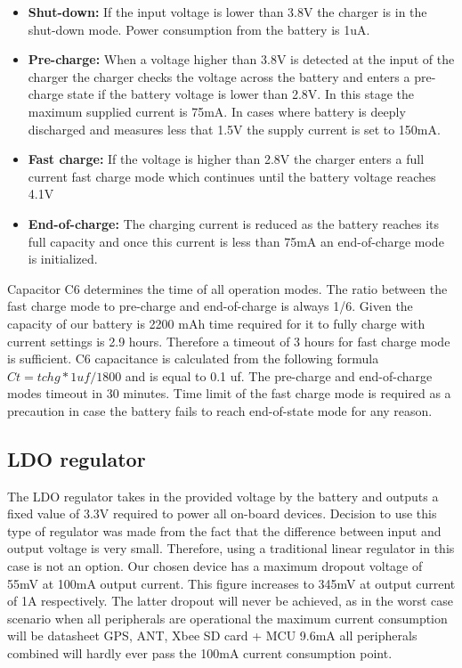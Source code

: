 \begin{itemize}
\item \textbf{Shut-down:} If the input voltage is lower than 3.8V the charger is in the shut-down mode. Power consumption from the battery is 1uA.
\item \textbf{Pre-charge:} When a voltage higher than 3.8V is detected at the input of the charger the charger checks the voltage across the battery and enters a pre-charge state if the battery voltage is lower than 2.8V. In this stage the maximum supplied current is 75mA. In cases where battery is deeply discharged and measures less that 1.5V the supply current is set to 150mA. 
\item \textbf{Fast charge:} If the voltage is higher than 2.8V the charger enters a full current fast charge mode which continues until the battery voltage reaches 4.1V 
\item \textbf{End-of-charge:} The charging current is reduced as the battery reaches its full capacity and once this current is less than 75mA an end-of-charge mode is initialized. 
\end{itemize}

Capacitor C6 determines the time of all operation modes. The ratio between the fast charge mode to pre-charge and end-of-charge is always 1/6. Given the capacity of our battery is 2200 mAh time required for it to fully charge with current settings is 2.9 hours. Therefore a timeout of 3 hours for fast charge mode is sufficient. C6 capacitance is calculated from the following formula $Ct = tchg *  1uf / 1800$ and is equal to 0.1 uf. The pre-charge and end-of-charge modes timeout in 30 minutes. Time limit of the fast charge mode is required as a precaution in case the battery fails to reach end-of-state mode for any reason.


\subsection{LDO regulator}
The LDO regulator takes in the provided voltage by the battery and outputs a fixed value of 3.3V required to power all on-board devices. Decision to use this type of regulator was made from the fact that the difference between input and output voltage is very small. Therefore, using a traditional linear regulator in this case is not an option. Our chosen device has a maximum dropout voltage of 55mV at 100mA output current. This figure increases to 345mV at output current of 1A respectively. The latter dropout will never be achieved, as in the worst case scenario when all peripherals are operational the maximum current consumption will be  datasheet GPS, ANT, Xbee SD card + MCU 9.6mA
 all peripherals combined will hardly ever pass the 100mA current consumption point.
 
